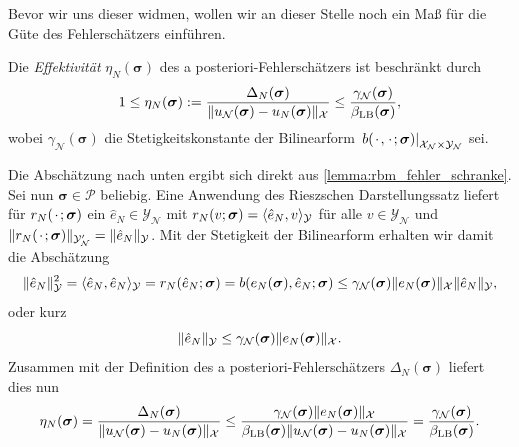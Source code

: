 \documentclass[../main.tex]{subfiles}
\begin{document}
Bevor wir uns dieser widmen, wollen wir an dieser Stelle noch ein Maß für die Güte des Fehlerschätzers einführen.

\begin{Lemma}
\label{lemma:effektivitaet}
    Die \emph{Effektivität} $\eta_{N}(\bm \sigma)$ des a posteriori-Fehlerschätzers ist beschränkt durch
    \begin{equation}
        1 \leq \eta_{N}(\bm \sigma) := \frac{\Delta_{N}(\bm \sigma)}{\lVert u_{\mathcal N}(\bm \sigma) - u_{N}(\bm \sigma)\rVert_{\mathcal X}} \leq \frac{\gamma_{\mathcal N}(\bm \sigma)}{\beta_{\mathrm{LB}}(\bm \sigma)},
    \end{equation}
    wobei $\gamma_{\mathcal N}(\bm \sigma)$ die Stetigkeitskonstante der Bilinearform $\left.b({\mkern2mu\cdot\mkern2mu}, {\mkern2mu\cdot\mkern2mu}; \bm \sigma)\right|_{\mathcal X_{\mathcal N} \times \mathcal Y_{\mathcal N}}$ sei.

    \begin{Beweis}
        Die Abschätzung nach unten ergibt sich direkt aus \cref{lemma:rbm_fehler_schranke}.
        Sei nun $\bm \sigma \in \mathcal P$ beliebig.
        Eine Anwendung des Rieszschen Darstellungssatz liefert für $r_{N}({\mkern2mu\cdot\mkern2mu}; \bm \sigma)$ ein $\hat{e}_{N} \in \mathcal Y_{\mathcal N}$ mit $r_{N}(v; \bm \sigma) = \langle\hat{e}_{N},v\rangle_{\mathcal Y}$ für alle $v \in \mathcal Y_{\mathcal N}$ und $\lVert r_{N}({\mkern2mu\cdot\mkern2mu}; \bm \sigma)\rVert_{\mathcal Y_{\mathcal N}'} = \lVert\hat{e}_{N}\rVert_{\mathcal Y}$.
        Mit der Stetigkeit der Bilinearform erhalten wir damit die Abschätzung
        \begin{equation}
            \lVert\hat{e}_{N}\rVert_{\mathcal Y}^{2}
            = \langle\hat{e}_{N},\hat{e}_{N}\rangle_{\mathcal Y}
            = r_{N}(\hat{e}_{N}; \bm \sigma)
            = b(e_{N}(\bm \sigma), \hat{e}_{N}; \bm \sigma)
            \leq \gamma_{\mathcal N}(\bm \sigma) \lVert e_{N}(\bm \sigma)\rVert_{\mathcal X} \lVert\hat{e}_{N}\rVert_{\mathcal Y},
        \end{equation}
        oder kurz
        \begin{equation}
            \lVert\hat{e}_{N}\rVert_{\mathcal Y} \leq \gamma_{\mathcal N}(\bm \sigma) \lVert e_{N}(\bm \sigma)\rVert_{\mathcal X}.
        \end{equation}
        Zusammen mit der Definition des a posteriori-Fehlerschätzers $\Delta_{N}(\bm \sigma)$ liefert dies nun
        \begin{equation}
            \eta_{N}(\bm \sigma)
            = \frac{\Delta_{N}(\bm \sigma)}{\lVert u_{\mathcal N}(\bm \sigma) - u_{N}(\bm \sigma)\rVert_{\mathcal X}}
            \leq \frac{\gamma_{\mathcal N}(\bm \sigma) \lVert e_{N}(\bm \sigma)\rVert_{\mathcal X}}{\beta_{\mathrm{LB}}(\bm \sigma)\lVert u_{\mathcal N}(\bm \sigma) - u_{N}(\bm \sigma)\rVert_{\mathcal X}}
            = \frac{\gamma_{\mathcal N}(\bm \sigma)}{\beta_{\mathrm{LB}}(\bm \sigma)}.
        \end{equation}
    \end{Beweis}
\end{Lemma}
\end{document}
